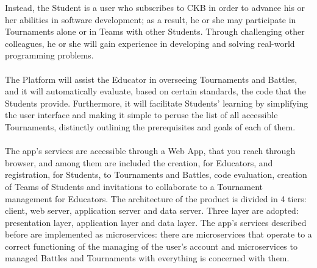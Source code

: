 Instead, the Student is a user who subscribes to CKB in order to advance his or her abilities in software development; as a result, he or she may participate in Tournaments alone or in Teams with other Students. Through challenging 
other colleagues, he or she will gain experience in developing and solving real-world programming problems.\\
\\
The Platform will assist the Educator in overseeing Tournaments and Battles, and it will automatically evaluate, based on certain standards, the code that the Students provide. Furthermore, it will facilitate Students' learning by 
simplifying the user interface and making it simple to peruse the list of all accessible Tournaments, distinctly outlining the prerequisites and goals of each of them.\\
\\
The app's services are accessible through a Web App, that you reach through browser, and among them are included the creation, for Educators, and registration, for Students, to Tournaments and Battles, code evaluation, creation of Teams of Students and invitations 
to collaborate to a Tournament management for Educators. 
The architecture of the product is divided in 4 tiers: client, web server, application server and data server. Three layer are adopted: presentation layer, application layer and data layer.
The app's services described before are implemented as microservices: there are microservices that operate to a correct functioning of the managing of the user's account and microservices to managed
Battles and Tournaments with everything is concerned with them.
